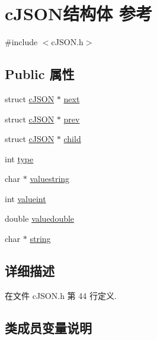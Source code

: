 \hypertarget{structc_j_s_o_n}{}\section{c\+J\+S\+O\+N结构体 参考}
\label{structc_j_s_o_n}


{\ttfamily \#include $<$c\+J\+S\+O\+N.\+h$>$}

\subsection*{Public 属性}
\begin{DoxyCompactItemize}
\item 
struct \hyperlink{structc_j_s_o_n}{c\+J\+S\+O\+N} $\ast$ \hyperlink{structc_j_s_o_n_ade862b880379b5e2a591f7326401fa8d}{next}
\item 
struct \hyperlink{structc_j_s_o_n}{c\+J\+S\+O\+N} $\ast$ \hyperlink{structc_j_s_o_n_ad521633b2c32126f59d962c5673de362}{prev}
\item 
struct \hyperlink{structc_j_s_o_n}{c\+J\+S\+O\+N} $\ast$ \hyperlink{structc_j_s_o_n_a401b274c2da358dac5c23ab8b2c71f85}{child}
\item 
int \hyperlink{structc_j_s_o_n_ab13084c574681593b12f6e0a3db0dcfc}{type}
\item 
char $\ast$ \hyperlink{structc_j_s_o_n_ad43f8de2571e504c4c5ce0a36990e6e1}{valuestring}
\item 
int \hyperlink{structc_j_s_o_n_a369cea49494eb5d4409d532a731a0fbf}{valueint}
\item 
double \hyperlink{structc_j_s_o_n_a4b21817d0fd2919901abadac73214e7f}{valuedouble}
\item 
char $\ast$ \hyperlink{structc_j_s_o_n_aa6b47e9a4b0e0a26f519b1a2b6739983}{string}
\end{DoxyCompactItemize}


\subsection{详细描述}


在文件 c\+J\+S\+O\+N.\+h 第 44 行定义.



\subsection{类成员变量说明}
\hypertarget{structc_j_s_o_n_a401b274c2da358dac5c23ab8b2c71f85}{}
